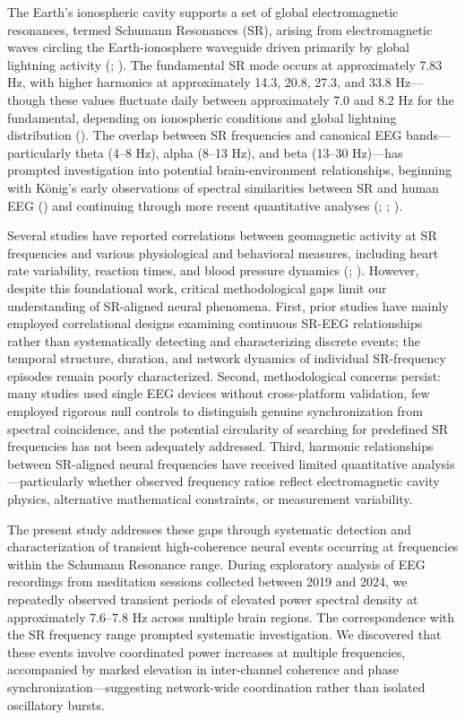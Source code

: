 \documentclass[11pt,a4paper]{article}
\begin{document}
The Earth's ionospheric cavity supports a set of global electromagnetic resonances, termed Schumann Resonances (SR), arising from electromagnetic waves circling the Earth-ionosphere waveguide driven primarily by global lightning activity (\cite{schumann1952strahlungslosen}; \cite{nickolaenko2014schumann}). The fundamental SR mode occurs at approximately 7.83 Hz, with higher harmonics at approximately 14.3, 20.8, 27.3, and 33.8 Hz—though these values fluctuate daily between approximately 7.0 and 8.2 Hz for the fundamental, depending on ionospheric conditions and global lightning distribution (\cite{price2016global}). The overlap between SR frequencies and canonical EEG bands—particularly theta (4–8 Hz), alpha (8–13 Hz), and beta (13–30 Hz)—has prompted investigation into potential brain-environment relationships, beginning with König's early observations of spectral similarities between SR and human EEG (\cite{konig1974eeg}) and continuing through more recent quantitative analyses (\cite{cherry2002schumann}; \cite{persinger2008possible}; \cite{saroka2016similar}).

Several studies have reported correlations between geomagnetic activity at SR frequencies and various physiological and behavioral measures, including heart rate variability, reaction times, and blood pressure dynamics (\cite{pobachenko2006contingency}; \cite{babayev2007effects}). However, despite this foundational work, critical methodological gaps limit our understanding of SR-aligned neural phenomena. First, prior studies have mainly employed correlational designs examining continuous SR-EEG relationships rather than systematically detecting and characterizing discrete events; the temporal structure, duration, and network dynamics of individual SR-frequency episodes remain poorly characterized. Second, methodological concerns persist: many studies used single EEG devices without cross-platform validation, few employed rigorous null controls to distinguish genuine synchronization from spectral coincidence, and the potential circularity of searching for predefined SR frequencies has not been adequately addressed. Third, harmonic relationships between SR-aligned neural frequencies have received limited quantitative analysis—particularly whether observed frequency ratios reflect electromagnetic cavity physics, alternative mathematical constraints, or measurement variability.

The present study addresses these gaps through systematic detection and characterization of transient high-coherence neural events occurring at frequencies within the Schumann Resonance range. During exploratory analysis of EEG recordings from meditation sessions collected between 2019 and 2024, we repeatedly observed transient periods of elevated power spectral density at approximately 7.6–7.8 Hz across multiple brain regions. The correspondence with the SR frequency range prompted systematic investigation. We discovered that these events involve coordinated power increases at multiple frequencies, accompanied by marked elevation in inter-channel coherence and phase synchronization—suggesting network-wide coordination rather than isolated oscillatory bursts.
\end{document}
